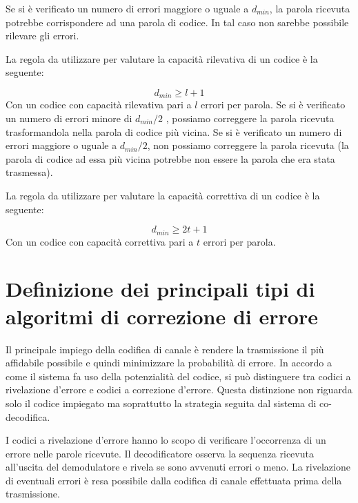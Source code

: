 \documentclass[LaM,binding=0.6cm]{../sapthesis}
\begin{document}
Se si è verificato un numero di errori maggiore o uguale a $d_{min}$, la
parola ricevuta potrebbe corrispondere ad una parola di codice. In
tal caso non sarebbe possibile rilevare gli errori.

La  regola  da  utilizzare  per  valutare  la  capacità  rilevativa  di  un
codice è la seguente:

\begin{equation}
    d_{min} \geq l + 1  
\end{equation}
Con un codice con capacità rilevativa pari a $l$ errori per parola.
\newline
Se  si  è  verificato  un  numero  di  errori  minore  di  $d_{min}/2$ , possiamo
correggere la parola ricevuta trasformandola nella parola di codice
più vicina.
\newline
Se  si  è  verificato  un  numero  di  errori  maggiore  o  uguale  a  $d_{min}/2$,
non possiamo correggere la parola ricevuta (la parola di codice ad
essa  più  vicina  potrebbe  non  essere  la  parola  che  era  stata
trasmessa).

La  regola  da  utilizzare  per  valutare  la  capacità  correttiva  di  un
codice è la seguente:

\begin{equation}
    d_{min} \geq 2t +1 
\end{equation}
Con un codice con capacità correttiva pari a $t$ errori per parola.



\section{Definizione dei principali tipi di algoritmi di correzione di errore}

Il principale impiego della codifica di canale è rendere la trasmissione il più affidabile possibile e quindi minimizzare la probabilità di errore. In accordo a come il sistema fa uso della potenzialità del codice, si può distinguere tra codici a rivelazione d'errore e codici a correzione d'errore. Questa distinzione non riguarda solo il codice impiegato ma soprattutto la strategia seguita dal sistema di co-decodifica.

I codici a rivelazione d'errore hanno lo scopo di verificare l'occorrenza di un errore nelle parole ricevute. Il decodificatore osserva la sequenza ricevuta all'uscita del demodulatore e rivela se sono avvenuti errori o meno. La rivelazione di eventuali errori è resa possibile dalla codifica di canale effettuata prima della trasmissione. 
\end{document}
